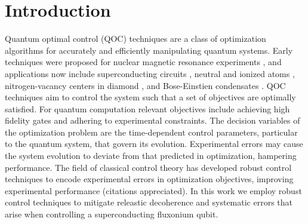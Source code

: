 \section{Introduction}
Quantum optimal control (QOC) techniques are a class of optimization
algorithms for accurately and efficiently manipulating quantum systems.
Early techniques were proposed for nuclear magnetic resonance experiments
\cite{khaneja2005optimal}, and applications now include superconducting
circuits \cite{heeres2017implementing,
  huang2020engineering, leng2019robust, leung2017speedup, xu2020nonadiabatic},
neutral and ionized atoms \cite{van2016optimal}, nitrogen-vacancy centers in
diamond \cite{rembold2020introduction}, and Bose-Einstien condensates
\cite{sorensen2018quantum}. QOC techniques aim to control the system
such that a set of objectives are optimally satisfied.
For quantum computation relevant objectives include achieving high fidelity
gates and adhering to experimental constraints.
The decision variables of the optimization problem are the time-dependent control
parameters, particular to the quantum system, that govern its evolution.
Experimental errors may cause the system evolution to deviate from that predicted in
optimization, hampering performance.
The field of classical control theory has developed robust control techniques
to encode experimental errors in optimization objectives, improving
experimental performance (citations appreciated).
In this work we employ robust control techniques to mitigate
releastic decoherence and systematic errors that arise when controlling
a superconducting fluxonium qubit.

